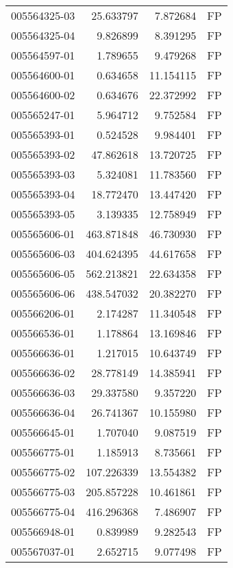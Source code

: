 \begin{tabular}{lrrl}
005564325-03 &   25.633797 &       7.872684 &   FP \\
005564325-04 &    9.826899 &       8.391295 &   FP \\
005564597-01 &    1.789655 &       9.479268 &   FP \\
005564600-01 &    0.634658 &      11.154115 &   FP \\
005564600-02 &    0.634676 &      22.372992 &   FP \\
005565247-01 &    5.964712 &       9.752584 &   FP \\
005565393-01 &    0.524528 &       9.984401 &   FP \\
005565393-02 &   47.862618 &      13.720725 &   FP \\
005565393-03 &    5.324081 &      11.783560 &   FP \\
005565393-04 &   18.772470 &      13.447420 &   FP \\
005565393-05 &    3.139335 &      12.758949 &   FP \\
005565606-01 &  463.871848 &      46.730930 &   FP \\
005565606-03 &  404.624395 &      44.617658 &   FP \\
005565606-05 &  562.213821 &      22.634358 &   FP \\
005565606-06 &  438.547032 &      20.382270 &   FP \\
005566206-01 &    2.174287 &      11.340548 &   FP \\
005566536-01 &    1.178864 &      13.169846 &   FP \\
005566636-01 &    1.217015 &      10.643749 &   FP \\
005566636-02 &   28.778149 &      14.385941 &   FP \\
005566636-03 &   29.337580 &       9.357220 &   FP \\
005566636-04 &   26.741367 &      10.155980 &   FP \\
005566645-01 &    1.707040 &       9.087519 &   FP \\
005566775-01 &    1.185913 &       8.735661 &   FP \\
005566775-02 &  107.226339 &      13.554382 &   FP \\
005566775-03 &  205.857228 &      10.461861 &   FP \\
005566775-04 &  416.296368 &       7.486907 &   FP \\
005566948-01 &    0.839989 &       9.282543 &   FP \\
005567037-01 &    2.652715 &       9.077498 &   FP \\

\end{tabular}
